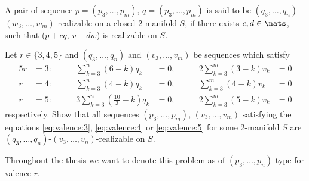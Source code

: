 \begin{definition}\label{def:eberhard:realizable}
  A pair of sequence $p = (p_3, \dots, p_m)$, $q = (p_3, \dots, p_m)$ is said to be $(q_3, \dots, q_n)$-$(w_3, \dots, w_m)$-realizable on a closed $2$-manifold $S$, if there exists $c, d \in \nats$, such that ($p + c q$, $v + d w$) is realizable on $S$.
\end{definition}
\begin{problem}\label{problem:eberhard}
  Let $r \in \{3, 4, 5\}$ and $(q_3, \dots, q_n)$ and $(v_3, \dots, v_m)$ be sequences which satisfy
  \begin{alignat}{5}
    r &= 3: \qquad &  \sum_{k=3}^n \left(           6 - k \right) q_k &= 0, \qquad &2 \sum_{k=3}^m \left(3 - k \right) v_k &= 0 \label{eq:zero:curv:3}\\
    r &= 4: \qquad &  \sum_{k=3}^n \left(           4 - k \right) q_k &= 0, \qquad &  \sum_{k=3}^m \left(4 - k \right) v_k &= 0 \label{eq:zero:curv:4}\\
    r &= 5: \qquad &3 \sum_{k=3}^n \left(\frac{10}{3} - k \right) q_k &= 0, \qquad &2 \sum_{k=3}^m \left(5 - k \right) v_k &= 0 \label{eq:zero:curv:5}
  \end{alignat}
  respectively. Show that all sequences $(p_3, \dots, p_m)$, $(v_3, \dots, v_m)$ satisfying the equations \ref{eq:valence:3}, \ref{eq:valence:4} or \ref{eq:valence:5} for some $2$-manifold $S$ are $(q_3, \dots, q_n)$-$(v_3, \dots, v_n)$-realizable on $S$.
\end{problem}

\begin{notation}
  Throughout the thesis we want to denote this problem as of $(p_3, \dots, p_n)$-type for valence $r$.
\end{notation}

